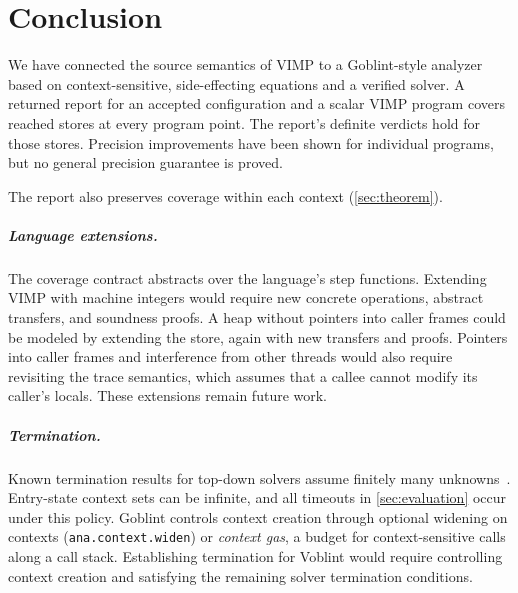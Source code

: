 \section{Conclusion}
\label{sec:conclusion}

We have connected the source semantics of VIMP to a Goblint-style analyzer
based on context-sensitive, side-effecting equations and a verified solver.
A returned report for an accepted configuration and a scalar VIMP program
covers reached stores at every program point. The report's definite verdicts hold
for those stores. Precision improvements have been shown for individual programs, but no general precision guarantee
is proved.

The report also preserves coverage within each context
(\cref{sec:theorem}).

\subparagraph*{Language extensions.}
The coverage contract abstracts over the language's step functions. Extending
VIMP with machine integers would require new concrete operations, abstract
transfers, and soundness proofs. A heap without pointers into caller frames
could be modeled by extending the store, again with new transfers and proofs.
Pointers into caller frames and interference from other threads would also
require revisiting the trace semantics, which assumes that a callee cannot
modify its caller's locals. These extensions remain future work.

\subparagraph*{Termination.}
Known termination results for top-down solvers assume finitely many
unknowns~\cite{tilscher26jar}. Entry-state context sets can be infinite, and
all timeouts in \cref{sec:evaluation} occur under this policy. Goblint controls
context creation through optional widening on contexts (\texttt{ana.context.widen})
or \emph{context gas}, a budget for context-sensitive calls along a call stack.
Establishing termination for Voblint would require controlling context
creation and satisfying the remaining solver termination conditions.
